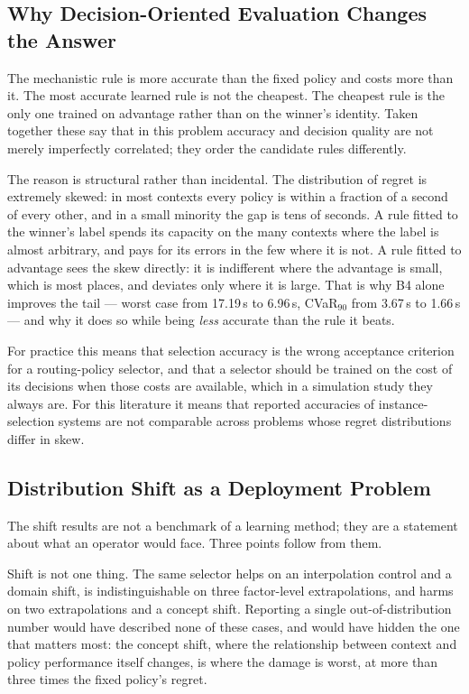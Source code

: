 \subsection{Why Decision-Oriented Evaluation Changes the Answer}
\label{sec:disc:decision}

The mechanistic rule is more accurate than the fixed policy and costs more than
it. The most accurate learned rule is not the cheapest. The cheapest rule is the
only one trained on advantage rather than on the winner's identity. Taken
together these say that in this problem accuracy and decision quality are not
merely imperfectly correlated; they order the candidate rules differently.

The reason is structural rather than incidental. The distribution of regret is
extremely skewed: in most contexts every policy is within a fraction of a second
of every other, and in a small minority the gap is tens of seconds. A rule fitted
to the winner's label spends its capacity on the many contexts where the label is
almost arbitrary, and pays for its errors in the few where it is not. A rule fitted
to advantage sees the skew directly: it is indifferent where the advantage is
small, which is most places, and deviates only where it is large. That is why B4
alone improves the tail --- worst case from 17.19\,s to 6.96\,s, CVaR$_{90}$ from
3.67\,s to 1.66\,s --- and why it does so while being \emph{less} accurate than the
rule it beats.

For practice this means that selection accuracy is the wrong acceptance criterion
for a routing-policy selector, and that a selector should be trained on the cost
of its decisions when those costs are available, which in a simulation study they
always are. For this literature it means that reported accuracies of
instance-selection systems are not comparable across problems whose regret
distributions differ in skew.

\subsection{Distribution Shift as a Deployment Problem}
\label{sec:disc:shift}

The shift results are not a benchmark of a learning method; they are a statement
about what an operator would face. Three points follow from them.

Shift is not one thing. The same selector helps on an interpolation control and a
domain shift, is indistinguishable on three factor-level extrapolations, and
harms on two extrapolations and a concept shift. Reporting a single
out-of-distribution number would have described none of these cases, and would
have hidden the one that matters most: the concept shift, where the relationship
between context and policy performance itself changes, is where the damage is
worst, at more than three times the fixed policy's regret.

